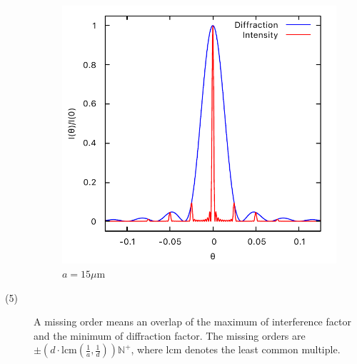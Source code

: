 \documentclass[11pt, twoside]{article}   	%
\theoremstyle{plain}
\theoremstyle{definition}
\begin{document}
\begin{description}
\begin{figure}[htbp]
		\begin{minipage}[t]{0.33\linewidth}
		\centering
		\includegraphics[width=0.9\linewidth]{a=15}
		\caption{$a=15\mu\mathrm{m}$}
		\end{minipage}
	\end{figure}

		\item[(5)] A missing order means an overlap of the maximum of interference factor and the
			minimum of diffraction factor. The missing orders are $\pm \left( d \cdot \mathrm{lcm}
			\left( \frac{1}{a}, \frac{1}{d} \right) \right) \mathbb N^+$, where $\mathrm{lcm}$
			denotes the least common multiple.


\end{description}
\end{document}
